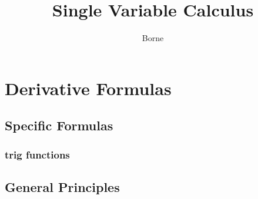 \documentclass{ctexart}
\title{Single Variable Calculus}
\author{Borne}
\date{\zhtoday}
\numberwithin{equation}{section}
\numberwithin{figure}{section}
\begin{document}
\maketitle
\thispagestyle{empty}

\newpage
\tableofcontents
\thispagestyle{empty}
\newpage
\setcounter{page}{1}

\newpage
\section{Derivative Formulas}
\subsection{Specific Formulas}
\subsubsection{trig functions}



\subsection{General Principles}


\newpage
\nocite{CalculusSingleVariable}

\end{document}
